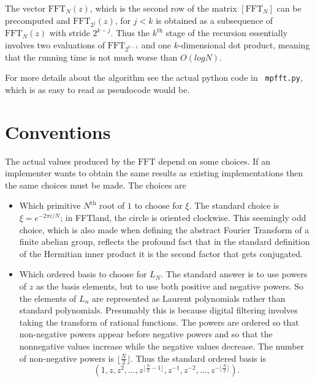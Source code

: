\documentclass[12pt, letterpaper, oneside]{amsart}
\theoremstyle{definition}
\theoremstyle{plain}
\numberwithin{equation}{para}
\numberwithin{figure}{section}
\newcommand{\FFT}{\text{FFT}}
\renewcommand{\th}{\text{th}}
\begin{document}
The vector $\FFT_N(z)$, which is the second row of the matrix $[\FFT_N]$ can
be precomputed and $\FFT_{2^j}(z)$, for $j < k$ is obtained as a subsequence
of $\FFT_N(z)$ with stride $2^{k-j}$.  Thus the $k^\th$ stage of the recursion
essentially involves two evaluations of $\FFT_{2^{k-1}}$ and one $k$-dimensional
dot product, meaning that the running time is not much worse than $O(log N)$.

For more details about the algorithm see the actual python code in {\tt
  mpfft.py}, which is as easy to read as pseudocode would be.

\section{Conventions}

The actual values produced by the $\FFT$ depend on some choices.  If an
implementer wants to obtain the same results as existing implementations
then the same choices must be made.  The choices are
\begin{itemize}
\setlength\itemsep{1em}

\item Which primitive $N^\th$ root of $1$ to choose for $\xi$.  The standard
choice is $\xi = e^{-2\pi i/N}$; in FFTland, the circle is oriented clockwise.
This seemingly odd choice, which is also made when defining the abstract Fourier
Transform of a finite abelian group, reflects the profound fact that in the
standard definition of the Hermitian inner product it is the second factor that
gets conjugated.

\item Which ordered basis to choose for $L_N$.  The standard answer is to use
powers of $z$ as the basis elements, but to use both positive and negative
powers.  So the elements of $L_n$ are represented as Laurent polynomials
rather than standard polynomials.  Presumably this is because digital filtering
involves taking the transform of rational functions.  The powers are ordered
so that non-negative powers appear before negative powers and so that the
nonnegative values increase while the negative values decrease. The number
of non-negative powers is $\lfloor \frac{N}{2}\rfloor$.  Thus the standard ordered
basis is
$$(1, z, z^2, \ldots, z^{\lfloor \frac{N}{2} - 1\rfloor}, z^{-1}, z^{-2},
\ldots, z^{-\lfloor \frac{N}{2}\rfloor}).$$
\end{itemize}
\end{document}
